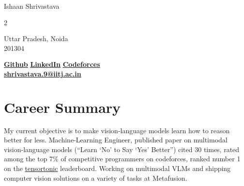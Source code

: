 \documentclass[letterpaper,11pt]{article}
\begin{document}
\begin{center}
    {\LARGE{Ishaan Shrivastava}} \\ \vspace{0pt}
    \begin{multicols}{2}
    \begin{flushleft}
    \large{Uttar Pradesh, Noida} \\
    \large{201304} \\
    \end{flushleft}
    
    \begin{flushright}
    \href{https://github.com/shrivastava95}{\bf\underline{Github}}
    \href{https://www.linkedin.com/in/ishaanshri95/}{\bf\underline{LinkedIn}}
    \href{https://codeforces.com/profile/ishaanshri95}{\bf\underline{Codeforces}}
    \\
    \href{mailto:shrivastava.9@iitj.ac.in}{\bf{shrivastava.9@iitj.ac.in}}
    \end{flushright}
    \end{multicols}
\end{center}


\section{Career Summary}


My current objective is to make vision-language models learn how to reason better for less. Machine-Learning Engineer, published paper on multimodal vision-language models (“Learn ‘No’ to Say ‘Yes’ Better”) cited 30 times, rated among the top 7\% of competitive programmers on codeforces, ranked number 1 on the \href{https://www.tensortonic.com/}{tensortonic} leaderboard. Working on multimodal VLMs and shipping computer vision solutions on a variety of tasks at Metafusion.

\end{document}
